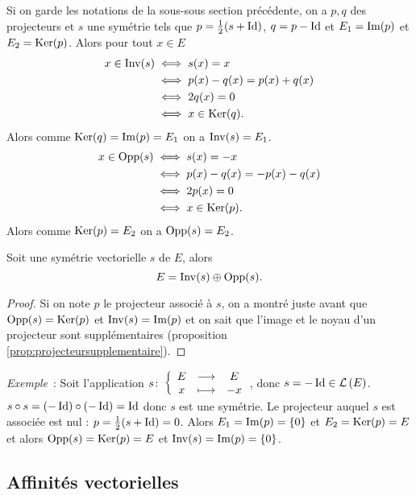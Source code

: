 Si on garde les notations de la sous-sous section précédente, on a \(p,q\) des projecteurs et \(s\) une symétrie tels que \(p=\frac{1}{2}(s+\operatorname{Id})\), \(q=p-\operatorname{Id}\) et \(E_1=\operatorname{Im}(p)\) et \(E_2=\operatorname{Ker}(p)\). Alors pour tout \(x \in E\)
\begin{align}
  x \in \operatorname{Inv}(s) &\iff s(x)=x \\
                &\iff p(x)-q(x)=p(x)+q(x) \\
                &\iff 2q(x)=0\\
                &\iff x \in \operatorname{Ker}(q).
\end{align}
Alors comme \(\operatorname{Ker}(q)=\operatorname{Im}(p)=E_1\) on a \(\operatorname{Inv}(s)=E_1\).
\begin{align}
  x \in \operatorname{Opp}(s) &\iff s(x)=-x \\
                &\iff p(x)-q(x)=-p(x)-q(x) \\
                &\iff 2p(x)=0\\
                &\iff x \in \operatorname{Ker}(p).
\end{align}
Alors comme \(\operatorname{Ker}(p)=E_2\) on a \(\operatorname{Opp}(s)=E_2\).
%
\begin{prop}
  Soit une symétrie vectorielle \(s\) de \(E\), alors
  \begin{equation}
    E=\operatorname{Inv}(s) \oplus \operatorname{Opp}(s).
  \end{equation}
\end{prop}
\begin{proof}
  Si on note \(p\) le projecteur associé à \(s\), on a montré juste avant que \(\operatorname{Opp}(s)=\operatorname{Ker}(p)\) et \(\operatorname{Inv}(s)=\operatorname{Im}(p)\) et on sait que l'image et le noyau d'un projecteur sont supplémentaires (proposition~
  \ref{prop:projecteursupplementaire}).
\end{proof}

\emph{Exemple}~: Soit l'application \(s\colon \left\{\begin{array}{ccc} E & \longrightarrow &E\\ x & \longmapsto & -x \end{array} \right.\), donc \(s=-\operatorname{Id} \in \mathcal{L}\left(E\right)\). \(s \circ s = (-\operatorname{Id}) \circ (-\operatorname{Id}) = \operatorname{Id}\) donc \(s\) est une symétrie. Le projecteur auquel \(s\) est associée est nul : \(p=\frac{1}{2}(s+\operatorname{Id})=0\). Alors \(E_1=\operatorname{Im}(p)=\{0\}\) et \(E_2=\operatorname{Ker}(p)=E\) et alors \(\operatorname{Opp}(s)=\operatorname{Ker}(p)=E\) et \(\operatorname{Inv}(s)=\operatorname{Im}(p)=\{0\}\).

\subsection{Affinités vectorielles}
